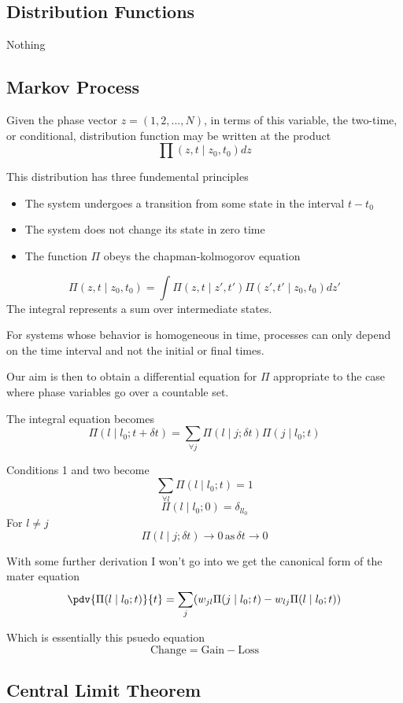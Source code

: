 \subsection{Distribution Functions}

Nothing

\subsection{Markov Process}

Given the phase vector $z = (1,2,...,N)$, in terms of this variable, the two-time, or conditional, distribution function may be written at the product
\[
\prod (z,t \mid z_0, t_0) dz
  \]

  This distribution has three fundemental principles
\begin{itemize}
  \item The system undergoes a transition from some state in the interval $t-t_0$
  \item The system does not change its state in zero time
  \item The function $\Pi$ obeys the chapman-kolmogorov equation
\end{itemize}
\[
  \Pi (z,t \mid z_0, t_0) = \int  \Pi (z,t \mid z', t') \Pi (z',t' \mid z_0, t_0)dz'
\]
The integral represents a sum over intermediate states.

For systems whose behavior is homogeneous in time, processes can only depend on the time interval and not the initial or final times.

Our aim is then to obtain a differential equation for $\Pi$ appropriate to the case where phase variables go over a countable set.

The integral equation becomes
\[
\Pi( l \mid l_0 ; t+ \delta t ) = \sum_{\forall j} \Pi ( l \mid j ; \delta t ) \Pi ( j \mid l_0 ; t )
  \]

  Conditions 1 and two become
\[
\sum_{\forall l}\Pi (l \mid l_0; t) =1
  \]
\[
\Pi(l \mid l_0;0) = \delta_{ll_0}
  \]
  For $l \neq j$
\[
\Pi (l \mid j; \delta t) \to 0 \, \text{as} \, \delta t \to 0
  \]

  With some further derivation I won't go into we get the canonical form of the mater equation
\[
  \pdv{\Pi(l \mid l_0 ; t)}{t} = \sum_j (w_{jl} \Pi (j \mid l_0 ; t) - w_{lj} \Pi (l \mid l_0; t))
\]

Which is essentially this psuedo equation
$$\text{Change} = \text{Gain} - \text{Loss}$$

\subsection{Central Limit Theorem}

